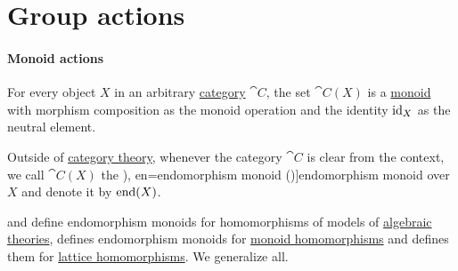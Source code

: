\section{Group actions}\label{sec:group_actions}

\paragraph{Monoid actions}

\begin{definition}\label{def:endomorphism_monoid}\mimprovised
  For every object \( X \) in an arbitrary \hyperref[def:category]{category} \( \cat{C} \), the set \( \cat{C}(X) \) is a \hyperref[def:monoid]{monoid} with morphism composition as the monoid operation and the identity \( \operatorname{id}_X \) as the neutral element.

  Outside of \hyperref[ch:category_theory]{category theory}, whenever the category \( \cat{C} \) is clear from the context, we call \( \cat{C}(X) \) the \term[ru=полугруппа эндоморфизмов (\cite[127]{Курош1973ОбщаяАлгебра}), en=endomorphism monoid (\cite[60]{Jacobson1985BasicAlgebraI})]{endomorphism monoid} over \( X \) and denote it by \( \operatorname{end}(X) \).
\end{definition}
\begin{comments}
  \item {} and  define endomorphism monoids for homomorphisms of models of \hyperref[def:algebraic_theory]{algebraic theories},  defines endomorphism monoids for \hyperref[def:monoid/homomorphism]{monoid homomorphisms} and  defines them for \hyperref[def:lattice/homomorphism]{lattice homomorphisms}. We generalize all.
\end{comments}

